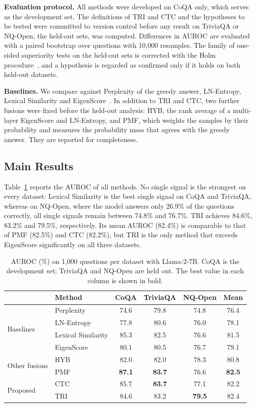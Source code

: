 \documentclass[conference]{IEEEtran}
\begin{document}
\textbf{Evaluation protocol.} All methods were developed on CoQA only, which serves as the development set. The definitions of TRI and CTC and the hypotheses to be tested were committed to version control before any result on TriviaQA or NQ-Open, the held-out sets, was computed. Differences in AUROC are evaluated with a paired bootstrap over questions with 10,000 resamples. The family of one-sided superiority tests on the held-out sets is corrected with the Holm procedure~\cite{holm1979}, and a hypothesis is regarded as confirmed only if it holds on both held-out datasets.

\textbf{Baselines.} We compare against Perplexity of the greedy answer, LN-Entropy, Lexical Similarity and EigenScore~\cite{chen2024inside}. In addition to TRI and CTC, two further fusions were fixed before the held-out analysis: HYB, the rank average of a multi-layer EigenScore and LN-Entropy, and PMF, which weights the samples by their probability and measures the probability mass that agrees with the greedy answer. They are reported for completeness.

\subsection{Main Results}
Table~\ref{tab:auroc} reports the AUROC of all methods. No single signal is the strongest on every dataset: Lexical Similarity is the best single signal on CoQA and TriviaQA, whereas on NQ-Open, where the model answers only 26.9\% of the questions correctly, all single signals remain between 74.8\% and 76.7\%. TRI achieves 84.6\%, 83.2\% and 79.5\%, respectively. Its mean AUROC (82.4\%) is comparable to that of PMF (82.5\%) and CTC (82.2\%), but TRI is the only method that exceeds EigenScore significantly on all three datasets.

\begin{table}[t]
\centering
\caption{AUROC (\%) on 1,000 questions per dataset with Llama-2-7B. CoQA is the development set; TriviaQA and NQ-Open are held out. The best value in each column is shown in bold.}
\label{tab:auroc}
\footnotesize
\setlength{\tabcolsep}{3.5pt}
\begin{tabular}{@{}llcccc@{}}
\toprule
& Method & CoQA & TriviaQA & NQ-Open & Mean \\
\midrule
\multirow{4}{*}{Baselines} & Perplexity & 74.6 & 79.8 & 74.8 & 76.4 \\
& LN-Entropy & 77.8 & 80.6 & 76.0 & 78.1 \\
& Lexical Similarity & 85.3 & 82.5 & 76.6 & 81.5 \\
& EigenScore~\cite{chen2024inside} & 80.1 & 80.5 & 76.7 & 79.1 \\
\midrule
\multirow{2}{*}{Other fusions} & HYB & 82.0 & 82.0 & 78.3 & 80.8 \\
& PMF & \textbf{87.1} & \textbf{83.7} & 76.6 & \textbf{82.5} \\
\midrule
\multirow{2}{*}{Proposed} & CTC & 85.7 & \textbf{83.7} & 77.1 & 82.2 \\
& TRI & 84.6 & 83.2 & \textbf{79.5} & 82.4 \\
\bottomrule
\end{tabular}
\end{table}
\end{document}
